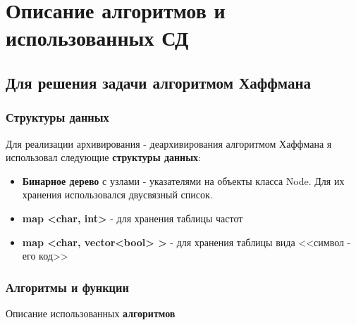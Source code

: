 \documentclass[a4paper, 12pt]{article}
\begin{document}
\newpage
\section{Описание алгоритмов и использованных СД}
\subsection{Для решения задачи алгоритмом Хаффмана}

\subsubsection{Структуры данных}
Для реализации архивирования - деархивирования алгоритмом Хаффмана я использовал
следующие \textbf{структуры данных}:
\begin{itemize}
  \item \textbf{Бинарное дерево} с узлами - указателями на объекты класса Node.
  Для их хранения использовался двусвязный список.
  \item \textbf{map <char, int>} - для хранения таблицы частот
  \item \textbf{map <char, vector<bool> >} - для хранения таблицы вида <<символ - его код>>
\end{itemize}

\subsubsection{Алгоритмы и функции}
Описание использованных \textbf{алгоритмов}
\end{document}
